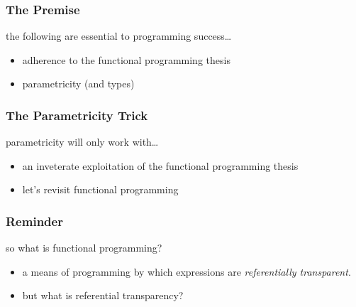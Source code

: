 \begin{frame}
\frametitle{The Premise}
\begin{block}{the following are essential to programming success\ldots}
\begin{itemize}
\item<1-> adherence to the functional programming thesis
\item<2-> parametricity (and types)
\end{itemize}
\end{block}
\end{frame}

\begin{frame}[fragile]
\frametitle{The Parametricity Trick}
\begin{block}{parametricity will only work with\ldots}
\begin{itemize}
\item<1-> an inveterate exploitation of the functional programming thesis
\item<2-> let's revisit functional programming
\end{itemize}
\end{block}
\end{frame}

\begin{frame}
\frametitle{Reminder}
\begin{block}{so what is functional programming?}
\begin{itemize}
\item<1-> a means of programming by which expressions are \emph{referentially transparent}.
\item<2-> but what is referential transparency?
\end{itemize}
\end{block}
\end{frame}
